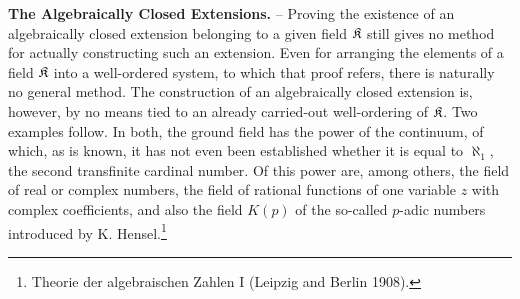 \textbf{The Algebraically Closed Extensions.} -- Proving the existence of an algebraically closed extension belonging to a given field \(\mathfrak K\) still gives no method for actually constructing such an extension. Even for arranging the elements of a field \(\mathfrak K\) into a well-ordered system, to which that proof refers, there is naturally no general method. The construction of an algebraically closed extension is, however, by no means tied to an already carried-out well-ordering of \(\mathfrak K\). Two examples follow. In both, the ground field has the power of the continuum, of which, as is known, it has not even been established whether it is equal to \(\aleph_1\), the second transfinite cardinal number. Of this power are, among others, the field of real or complex numbers, the field of rational functions of one variable \(z\) with complex coefficients, and also the field \(K(p)\) of the so-called \(p\)-adic numbers introduced by K. Hensel.\footnote{Theorie der algebraischen Zahlen I (Leipzig and Berlin 1908).}


